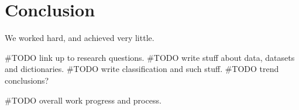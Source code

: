 \chapter{Conclusion}\label{conclusion}
We worked hard, and achieved very little.


#TODO link up to research questions. 
#TODO write stuff about data, datasets and dictionaries.
#TODO write classification and such stuff. 
#TODO trend conclusions?

#TODO overall work progress and process. 

